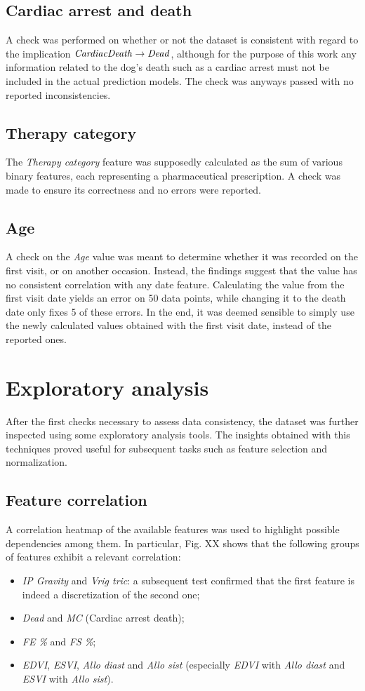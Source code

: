 \documentclass[12pt]{report}
\begin{document}
\subsection*{Cardiac arrest and death}
A check was performed on whether or not the dataset is consistent with regard to the implication $ \text{\emph{CardiacDeath}} \rightarrow \text{\emph{Dead}} $, although for the purpose of this work any information related to the dog's death such as a cardiac arrest must not be included in the actual prediction models. The check was anyways passed with no reported inconsistencies.
\subsection*{Therapy category}
The \textit{Therapy category} feature was supposedly calculated as the sum of various binary features, each representing a pharmaceutical prescription. A check was made to ensure its correctness and no errors were reported.
\subsection*{Age}
A check on the \textit{Age} value was meant to determine whether it was recorded on the first visit, or on another occasion. Instead, the findings suggest that the value has no consistent correlation with any date feature. Calculating the value from the first visit date yields an error on 50 data points, while changing it to the death date only fixes 5 of these errors. In the end, it was deemed sensible to simply use the newly calculated values obtained with the first visit date, instead of the reported ones.

\section{Exploratory analysis} \label{explanal}
After the first checks necessary to assess data consistency, the dataset was further inspected using some exploratory analysis tools. The insights obtained with this techniques proved useful for subsequent tasks such as feature selection and normalization.
\subsection*{Feature correlation}
A correlation heatmap of the available features was used to highlight possible dependencies among them. In particular, Fig. XX shows that the following groups of features exhibit a relevant correlation:
\begin{itemize}
\item \textit{IP Gravity} and \textit{Vrig tric}: a subsequent test confirmed that the first feature is indeed a discretization of the second one;
\item \textit{Dead} and \textit{MC} (Cardiac arrest death);
\item \textit{FE \%} and \textit{FS \%};
\item \textit{EDVI}, \textit{ESVI}, \textit{Allo diast} and \textit{Allo sist} (especially \textit{EDVI} with \textit{Allo diast} and \textit{ESVI} with \textit{Allo sist}).
\end{itemize}
\end{document}
